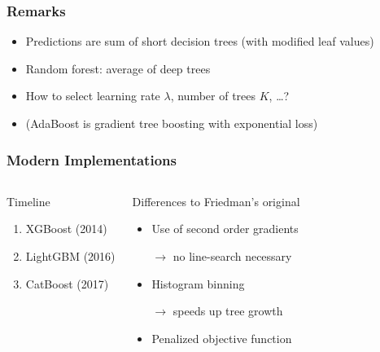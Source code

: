 \begin{frame}
	\frametitle{Remarks}
	\begin{itemize}
		\item Predictions are sum of short decision trees (with modified leaf values)
		\item Random forest: average of deep trees
		\item How to select learning rate $\lambda$, number of trees $K$, \dots?
		\item (AdaBoost is gradient tree boosting with exponential loss)
	\end{itemize}
\end{frame}

\begin{frame}
	\frametitle{Modern Implementations}
	\begin{columns}[onlytextwidth]
		\begin{block}{Timeline}
			\begin{enumerate}
				\item XGBoost (2014)
				\item LightGBM (2016)
				\item CatBoost (2017)
			\end{enumerate}
		\end{block}
		
		\begin{block}{Differences to Friedman's original}
			\begin{itemize}
				\item Use of second order gradients 
				
				$\rightarrow$ no line-search necessary
				\item Histogram binning
				
				$\rightarrow$ speeds up tree growth
				
				\item Penalized objective function
			\end{itemize}
		\end{block}
	\end{columns}
	\vfill
	
	\begin{example}
	\end{example}
\end{frame}

